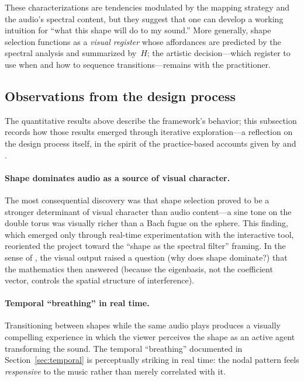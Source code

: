 \documentclass[]{interact}
\theoremstyle{plain}
\theoremstyle{definition}
\theoremstyle{remark}
\begin{document}
These characterizations are tendencies modulated by the mapping strategy and the audio's spectral content, but they suggest that one can develop a working intuition for ``what this shape will do to my sound.'' More generally, shape selection functions as a \emph{visual register} whose affordances are predicted by the spectral analysis and summarized by~$H$; the artistic decision---which register to use when and how to sequence transitions---remains with the practitioner.

\subsection{Observations from the design process}
\label{sec:observations}

The quantitative results above describe the framework's behavior; this subsection records how those results emerged through iterative exploration---a reflection on the design process itself, in the spirit of the practice-based accounts given by \citet{feijs2019} and \citet{dorfsmanhopkins2021}.

\paragraph{Shape dominates audio as a source of visual character.}
The most consequential discovery was that shape selection proved to be a stronger determinant of visual character than audio content---a sine tone on the double torus was visually richer than a Bach fugue on the sphere. This finding, which emerged only through real-time experimentation with the interactive tool, reoriented the project toward the ``shape as the spectral filter'' framing. In the sense of \citet{dorfsmanhopkins2021}, the visual output raised a question (why does shape dominate?) that the mathematics then answered (because the eigenbasis, not the coefficient vector, controls the spatial structure of interference).

\paragraph{Temporal ``breathing'' in real time.}
Transitioning between shapes while the same audio plays produces a visually compelling experience in which the viewer perceives the shape as an active agent transforming the sound. The temporal ``breathing'' documented in Section~\ref{sec:temporal} is perceptually striking in real time: the nodal pattern feels \emph{responsive} to the music rather than merely correlated with it.
\end{document}
